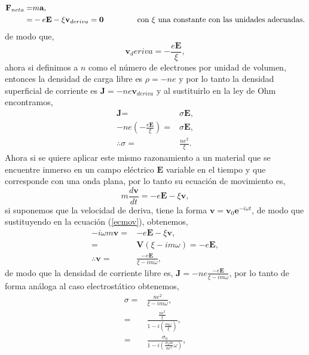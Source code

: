 \documentclass[11pt,fleqn]{book} %
\begin{document}
\begin{equation}
\begin{split}
\textbf{F}_{neta}=&m\textbf{a},\\
=&-e\textbf{E}-\xi\textbf{v}_{deriva}=\textbf{0}\hspace{1.5cm}\text{con $\xi$ una constante con las unidades adecuadas.}
\end{split}
\end{equation}
  de modo que,
  \begin{equation}
  \textbf{v}_deriva=-\frac{e\textbf{E}}{\xi},
  \end{equation}
ahora si definimos a $n$ como el n\'umero de electrones por unidad de volumen, entonces la densidad de carga libre es $\rho=-ne$ y por lo tanto la densidad superficial de corriente es $\textbf{J}=-ne\textbf{v}_{deriva}$ y al sustituirlo en la ley de Ohm encontramos,
\begin{equation}
\begin{split}
\textbf{J}=&\sigma\textbf{E},\\
-ne\left( -\frac{e\textbf{E}}{\xi} \right)=&\sigma\textbf{E},\\
  \therefore \sigma=&\frac{ne^2}{\xi}.
\end{split}
\end{equation}
Ahora si se quiere aplicar este mismo razonamiento a un material que se encuentre inmerso en un campo el\'ectrico $\textbf{E}$ variable en el tiempo y que corresponde con una onda plana, por lo tanto su ecuaci\'on de movimiento es,
\begin{equation} \label{ecmov}
m\frac{d\textbf{v}}{dt}=-e\textbf{E}-\xi\textbf{v},
\end{equation}
si suponemos que la velocidad de deriva, tiene la forma $\textbf{v}=\textbf{v}_0\textbf{e}^{-i \omega t}$, de modo que sustituyendo en la ecuaci\'on (\ref{ecmov}), obtenemos,
\begin{equation}
 \begin{split}
 -i\omega m\textbf{v}=&-e \textbf{E}-\xi \textbf{v},\\
 =&\textbf{V}(\xi-im\omega)=-e\textbf{E},\\
 \therefore \textbf{v}=&\frac{-e\textbf{E}}{\xi-im\omega},
 \end{split}
 \end{equation}
 de modo que la densidad de corriente libre es, $\textbf{J}=-ne\frac{-e\textbf{E}}{\xi-im\omega}$, por lo tanto de forma an\'aloga al caso electrost\'atico obtenemos,
\begin{equation} \label{sigma_frec}
 \begin{split}
\sigma=&\frac{ne^2}{\xi-im\omega},\\
=&\frac{\frac{ne^2}{\xi}}{1-i\left( \frac{m\omega}{\xi} \right)},\\
=&\frac{\sigma_0}{1-i\left( \frac{\sigma_0m}{ne^2}\omega \right)},
 \end{split}
 \end{equation}
\end{document}
